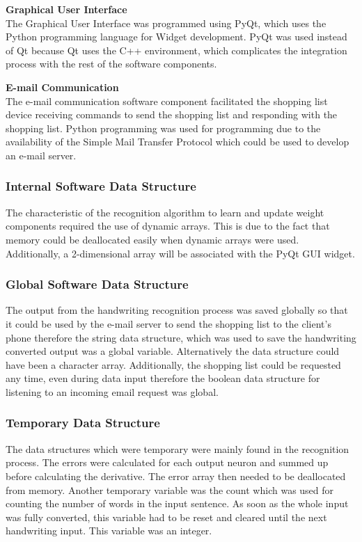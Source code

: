 \textbf{Graphical User Interface}\\
The Graphical User Interface was programmed using PyQt, which uses the Python programming language for Widget development. PyQt was used instead of Qt because Qt uses the C++ environment, which complicates the integration process with the rest of the software components.

\textbf{E-mail Communication}\\
The e-mail communication software component facilitated the shopping list device receiving commands to send the shopping list and responding with the shopping list. Python programming was used for programming due to the availability of the Simple Mail Transfer Protocol which could be used to develop an e-mail server.

\subsubsection{Internal Software Data Structure}
The characteristic of the recognition algorithm to learn and update weight components required the use of  dynamic arrays. This is due to the fact that memory could be deallocated easily when dynamic arrays were used. Additionally, a 2-dimensional array will be associated with the PyQt GUI widget.

\subsubsection{Global Software Data Structure}
The output from the handwriting recognition process was saved globally so that it could be used by the e-mail server to send the shopping list to the client's phone therefore the string data structure, which was used to save the handwriting converted output was a global variable. Alternatively the data structure could have been a character array. Additionally, the shopping list could be requested any time, even during data input therefore the boolean data structure for listening to an incoming email request was global. 
\subsubsection{Temporary Data Structure}
The data structures which were temporary were mainly found in the recognition process. The errors were calculated for each output neuron and summed up before calculating the derivative. The error array then needed to be deallocated from memory. Another temporary variable was the count which was used for counting the number of words in the input sentence. As soon as the whole input was fully converted, this variable had to be reset and cleared until the next handwriting input. This variable was an integer.

